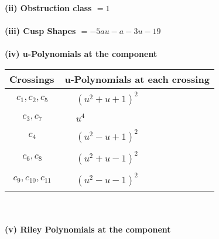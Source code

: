 \documentclass[1p]{elsarticle_modified}
\theoremstyle{definition}
\begin{document}
\flushleft \textbf{(ii) Obstruction class $= 1$}\\~\\
\flushleft \textbf{(iii) Cusp Shapes $= -5 a u- a-3 u-19$}\\~\\
\newpage\renewcommand{\arraystretch}{1}
\flushleft \textbf{(iv) u-Polynomials at the component}\newline \\
\begin{tabular}{m{50pt}|m{274pt}}
Crossings & \hspace{64pt}u-Polynomials at each crossing \\
\hline $$\begin{aligned}c_{1},c_{2},c_{5}\end{aligned}$$&$\begin{aligned}
&(u^2+u+1)^2
\end{aligned}$\\
\hline $$\begin{aligned}c_{3},c_{7}\end{aligned}$$&$\begin{aligned}
&u^4
\end{aligned}$\\
\hline $$\begin{aligned}c_{4}\end{aligned}$$&$\begin{aligned}
&(u^2- u+1)^2
\end{aligned}$\\
\hline $$\begin{aligned}c_{6},c_{8}\end{aligned}$$&$\begin{aligned}
&(u^2+u-1)^2
\end{aligned}$\\
\hline $$\begin{aligned}c_{9},c_{10},c_{11}\end{aligned}$$&$\begin{aligned}
&(u^2- u-1)^2
\end{aligned}$\\
\hline
\end{tabular}\\~\\
\newpage\renewcommand{\arraystretch}{1}
\flushleft \textbf{(v) Riley Polynomials at the component}\newline \\
\end{document}
